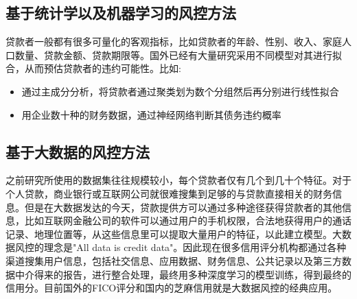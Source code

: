 \subsection{基于统计学以及机器学习的风控方法}
贷款者一般都有很多可量化的客观指标，比如贷款者的年龄、性别、收入、家庭人口数量、贷款金额、贷款期限等。国外已经有大量研究采用不同模型对其进行拟合，从而预估贷款者的违约可能性。比如: 
\begin{itemize}
	\item 通过主成分分析，将贷款者通过聚类划为数个分组然后再分别进行线性拟合\cite{2016konocreditrisk}
	\item 用企业数十种的财务数据，通过神经网络判断其债务违约概率\cite{angelini2008neural}
\end{itemize}
\subsection{基于大数据的风控方法}
之前研究所使用的数据集往往规模较小，每个贷款者仅有几个到几十个特征。对于个人贷款，商业银行或互联网公司就很难搜集到足够的与贷款直接相关的财务信息。但是在大数据发达的今天，贷款提供方可以通过多种途径获得贷款者的其他信息，比如互联网金融公司的软件可以通过用户的手机权限，合法地获得用户的通话记录、地理位置等，从这些信息里可以提取大量用户的特征，以此建立模型。大数据风控的理念是"All data is credit data"。因此现在很多信用评分机构都通过各种渠道搜集用户信息，包括社交信息、应用数据、财务信息、公共记录以及第三方数据中介得来的报告，进行整合处理，最终用多种深度学习的模型训练，得到最终的信用分。目前国外的FICO评分和国内的芝麻信用就是大数据风控的经典应用。\cite{叶文辉2015大数据征信机构的运作模式及监管对策}\cite{hurley2016credit}